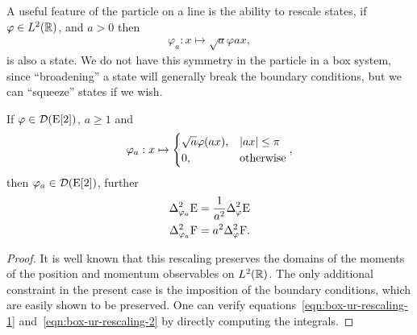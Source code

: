 A useful feature of the particle on a line is the ability to rescale states, if $\varphi\in L^2(\mathbb{R})$, and $a > 0$ then
\begin{align}
  \varphi_a:x\mapsto\sqrt{a}\varphi{ax},
\end{align}
is also a state. We do not have this symmetry in the particle in a box system, since ``broadening'' a state will generally break the boundary conditions, but we can ``squeeze'' states if we wish.
\begin{lem}\label{lem:box-ur-squeeze-states}
  If $\varphi\in\mathcal{D}(\operatorname{E}[2])$, $a \geq 1$ and
  \begin{align}
    \varphi_a:x\mapsto\begin{cases}\sqrt{a}\varphi(ax),& {\left\lvert{ax}\right\rvert}\leq \pi\\ 0, &\text{otherwise}\end{cases},
  \end{align}
  then $\varphi_a\in\mathcal{D}(\operatorname{E}[2])$, further
  \begin{align}
    \var[\varphi_a]{\ope} &= \frac{1}{a^2}\var[\varphi]{\ope}\label{eqn:box-ur-rescaling-1}\\
    \var[\varphi_a]{\opf} &= a^2\var[\varphi]{\opf}.\label{eqn:box-ur-rescaling-2}
  \end{align}
\end{lem}
\begin{proof}
  It is well known that this rescaling preserves the domains of the moments of the position and momentum observables on $L^2(\mathbb{R})$. The only additional constraint in the present case is the imposition of the boundary conditions, which are easily shown to be preserved. One can verify equations~\eqref{eqn:box-ur-rescaling-1} and~\eqref{eqn:box-ur-rescaling-2} by directly computing the integrals.
\end{proof}

